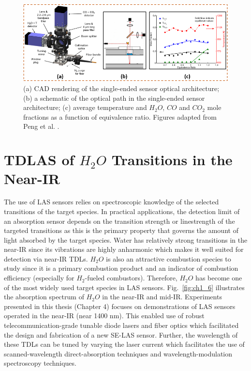\begin{figure}[ht]
    \centering
        \includegraphics[width=1\textwidth]{fig/ch1_fig4.png}
        \caption{(a) CAD rendering of the single-ended sensor optical architecture; (b) a schematic of the optical path in the single-ended sensor architecture; (c) average temperature and $H_2O$, $CO$ and $CO_2$ mole fractions as a function of equivalence ratio. Figures adapted from Peng et al. \cite{Peng:16}.}
    \label{fig:ch1_5}
\end{figure}

\section{TDLAS of $H_2O$ Transitions in the Near-IR}
The use of LAS sensors relies on spectroscopic knowledge of the selected transitions of the target species. In practical applications, the detection limit of an absorption sensor depends on the transition strength or linestrength of the targeted transitions as this is the primary property that governs the amount of light absorbed by the target species. Water has relatively strong transitions in the near-IR since its vibrations are highly anharmonic which makes it well suited for detection via near-IR TDLs. $H_2O$ is also an attractive combustion species to study since it is a primary combustion product and an indicator of combustion efficiency (especially for $H_2$-fueled combustors). Therefore, $H_2O$ has become one of the most widely used target species in LAS sensors. Fig.\ \ref{fig:ch1_6} illustrates the absorption spectrum of $H_2O$ in the near-IR and mid-IR. Experiments presented in this thesis (Chapter 4) focuses on demonstrations of LAS sensors operated in the near-IR (near 1400 nm). This enabled use of robust telecommunication-grade tunable diode lasers and fiber optics which facilitated the design and fabrication of a new SE-LAS sensor. Further, the wavelength of these TDLs can be tuned by varying the laser current which facilitates the use of scanned-wavelength direct-absorption techniques and wavelength-modulation spectroscopy techniques. 

